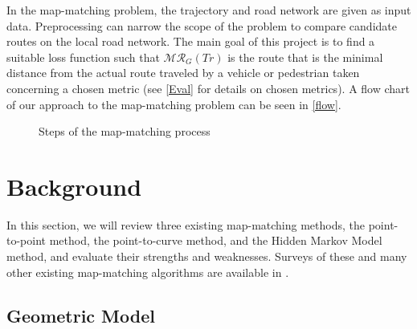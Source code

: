 \documentclass{article}
\numberwithin{equation}{section}
\theoremstyle{definition}
\begin{document}
In the map-matching problem, the trajectory and road network are given as input data. Preprocessing can narrow the scope of the problem to compare candidate routes on the local road network.  The main goal of this project is to find a suitable loss function such that  $\mathcal{MR}_G(Tr)$ is the route that is the minimal distance from the actual route traveled by a vehicle or pedestrian taken concerning a chosen metric (see \autoref{Eval} for details on chosen metrics). A flow chart of our approach to the map-matching problem can be seen in \autoref{flow}.
\begin{figure}
\raggedleft
    \caption{Steps of the map-matching process }
    \label{flow}
\end{figure}






    



\section{Background}

In this section, we will review three existing map-matching methods, the point-to-point method, the point-to-curve method, and the Hidden Markov Model method, and evaluate their strengths and weaknesses. Surveys of these and many other existing map-matching algorithms are available in \cite{CXHZ,QON}.


\subsection{Geometric Model}
\end{document}
